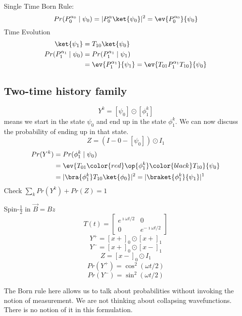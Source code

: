 \documentclass[a4paper,twoside,master.tex]{subfiles}
\begin{document}
Single Time Born Rule:
\begin{equation}
  Pr(P_0^{\alpha_0}\mid\psi_0)= |P_0^\alpha\ket{\psi_0}|^2 = \ev{P_0^{\alpha_0}}{\psi_0}
\end{equation}
Time Evolution
\begin{align}
    \ket{\psi_1} &= T_{10}\ket{\psi_0}\\
    Pr(P_1^{\alpha_1}\mid\psi_0) &= Pr(P_1^{\alpha_1}\mid\psi_1)\\
    &= \ev{P_1^{\alpha_1}}{\psi_1} = \ev{T_{01}P_1^{\alpha_1}T_{10}}{\psi_0}
\end{align}
\subsection{Two-time history family}
\begin{equation}
  Y^k = [\psi_0]\odot[\phi_1^k]
\end{equation}
means we start in the state $\psi_0$ and end up in the state $\phi_1^k$. We can now discuss the probability of ending up in that state.
\begin{equation}
  Z = (I-0 - [\psi_0])\odot I_1
\end{equation}
\begin{align}
    Pr(Y^k) &= Pr(\phi_1^k\mid\psi_0)\\
    &=\ev{T_{01}\color{red}\op{\phi_1^k}\color{black}T_{10}}{\psi_0}\\
    &= |\bra{\phi_1^k}T_{10}\ket{\phi_0}|^2 = |\braket{\phi_1^k}{\psi_1}|^1
\end{align}
Check $\sum_k Pr(Y^k) + Pr(Z) = 1$


\begin{ex}
    Spin-$ \frac{1}{2} $ in $\vec{B} = B\hat{z}$
\begin{equation}
  T(t) = \begin{bmatrix}
    e^{\imath\omega t/2}&0\\0&e^{-\imath\omega t/2}
  \end{bmatrix}
\end{equation}
\begin{equation}
  Y^+ = [x+]_0\odot[x+]_1
\end{equation}
\begin{equation}
  Y^- = [x+]_0\odot[x-]_1
\end{equation}
\begin{equation}
  Z = [x-]_0\odot I_1
\end{equation}
\begin{equation}
  Pr(Y^+) = \cos^2(\omega t/2)
\end{equation}
\begin{equation}
  Pr(Y^-) = \sin^2(\omega t/2)
\end{equation}

The Born rule here allows us to talk about probabilities without invoking the notion of measurement. We are not thinking about collapsing wavefunctions. There is no notion of it in this formulation.
\end{ex}
\end{document}
